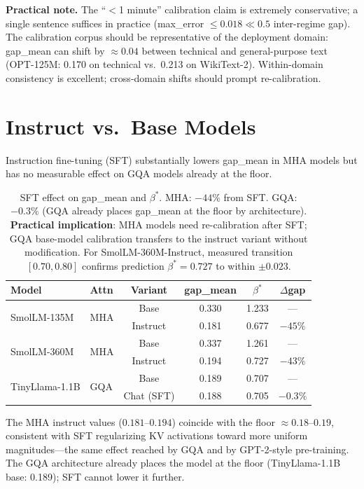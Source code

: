 \documentclass{article}
\begin{document}
\textbf{Practical note.} The ``$<$1 minute'' calibration claim is extremely conservative;
a single sentence suffices in practice (max\_error $\leq 0.018 \ll 0.5$ inter-regime gap).
The calibration corpus should be representative of the deployment domain: gap\_mean can shift
by $\approx 0.04$ between technical and general-purpose text (OPT-125M: 0.170 on technical
vs.\ 0.213 on WikiText-2). Within-domain consistency is excellent; cross-domain shifts should
prompt re-calibration.

\section{Instruct vs.\ Base Models}
\label{sec:instruct}

Instruction fine-tuning (SFT) substantially lowers gap\_mean in MHA models but has no
measurable effect on GQA models already at the floor.

\begin{table}[h]
\centering
\caption{SFT effect on gap\_mean and $\beta^*$. MHA: $-44\%$ from SFT. GQA: $-0.3\%$
(GQA already places gap\_mean at the floor by architecture).
\textbf{Practical implication}: MHA models need re-calibration after SFT; GQA base-model
calibration transfers to the instruct variant without modification. For SmolLM-360M-Instruct,
measured transition $[0.70, 0.80]$ confirms prediction $\beta^*{=}0.727$ to within $\pm0.023$.}
\begin{tabular}{llcccc}
\toprule
Model & Attn & Variant & gap\_mean & $\beta^*$ & $\Delta$gap \\
\midrule
\multirow{2}{*}{SmolLM-135M} & \multirow{2}{*}{MHA}
  & Base & 0.330 & 1.233 & --- \\
  & & Instruct & 0.181 & 0.677 & $-45\%$ \\
\midrule
\multirow{2}{*}{SmolLM-360M} & \multirow{2}{*}{MHA}
  & Base & 0.337 & 1.261 & --- \\
  & & Instruct & 0.194 & 0.727 & $-43\%$ \\
\midrule
\multirow{2}{*}{TinyLlama-1.1B} & \multirow{2}{*}{GQA}
  & Base & 0.189 & 0.707 & --- \\
  & & Chat (SFT) & 0.188 & 0.705 & $-0.3\%$ \\
\bottomrule
\end{tabular}
\label{tab:instruct}
\end{table}

The MHA instruct values ($0.181$--$0.194$) coincide with the floor $\approx 0.18$--$0.19$,
consistent with SFT regularizing KV activations toward more uniform magnitudes---the same
effect reached by GQA and by GPT-2-style pre-training. The GQA architecture already places
the model at the floor (TinyLlama-1.1B base: 0.189); SFT cannot lower it further.
\end{document}
